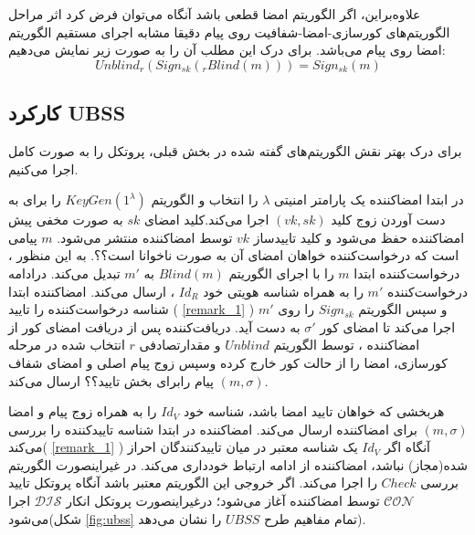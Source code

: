 \documentclass[12pt,a4paper]{article}
\begin{document}
علاوه‌براین، اگر الگوریتم امضا قطعی باشد آنگاه می‌توان فرض کرد اثر مراحل الگوریتم‌های کورسازی-امضا-شفافیت روی پیام دقیقا مشابه اجرای مستقیم الگوریتم امضا روی پیام می‌باشد. برای درک این مطلب آن را به صورت زیر نمایش می‌دهیم:
$$ Unblind_r(Sign_{sk}(_{r}Blind(m))) = Sign_{sk}(m) $$

\newpage
\subsection{کارکرد UBSS}\label{working_ubss}

برای درک بهتر نقش الگوریتم‌های گفته شده در بخش قبلی، پروتکل را به صورت کامل اجرا می‌کنیم.

در ابتدا امضاکننده یک پارامتر امنیتی 
$\lambda$
را انتخاب و الگوریتم 
$KeyGen(1^\lambda)$
را برای به دست آوردن زوج کلید
$(vk,sk)$
اجرا می‌کند.کلید امضای
$sk$
به صورت مخفی پیش امضاکننده حفظ می‌شود و کلید تاییدساز
$vk$
توسط امضاکننده منتشر می‌شود.
$m$
پیامی است که درخواست‌کننده خواهان امضای آن به صورت ناخوانا است؟؟. به این منظور ، درخواست‌کننده ابتدا 
$m$
 را با اجرای الگوریتم 
$Blind(m)$
به 
$m'$
تبدیل می‌کند.
درادامه درخواست‌کننده 
$m'$
را به همراه شناسه هویتی خود
$Id_R$
، ارسال می‌کند. امضاکننده ابتدا شناسه درخواست‌کننده را تایید (
\ref{remark_1}
) و سپس الگوریتم 
$Sign_{sk}$
را روی
$m'$
اجرا می‌کند تا امضای کور
$\sigma'$
به دست آید. دریافت‌کننده پس از دریافت امضای کور از امضاکننده ، توسط الگوریتم
$Unblind$
 و مقدارتصادفی 
$r$
انتخاب شده در مرحله کورسازی، امضا را از حالت کور خارج کرده وسپس زوج پیام اصلی و امضای شفاف
$(m,\sigma)$
پیام رابرای بخش تایید؟؟ ارسال می‌کند.

هربخشی که خواهان تایید امضا باشد، شناسه خود
$Id_V$
را به همراه زوج پیام و امضا 
$(m,\sigma)$
برای امضاکننده ارسال می‌کند. امضاکننده در ابتدا شناسه تاییدکننده را بررسی می‌کند(
\ref{remark_1}
) آنگاه اگر
$Id_V$
یک شناسه معتبر در میان تاییدکنندگان احراز شده(مجاز) نباشد، امضاکننده از ادامه ارتباط خودداری می‌کند. در غیراینصورت الگوریتم بررسی 
$Check$
را اجرا می‌کند. اگر خروجی این الگوریتم معتبر باشد آنگاه پروتکل تایید
$\mathcal{CON}$
توسط امضاکننده آغاز می‌شود؛ درغیراینصورت پروتکل انکار
$\mathcal{DIS}$
اجرا می‌شود(شکل 
\ref{fig:ubss}
 تمام مفاهیم طرح 
$UBSS$
را نشان می‌دهد).
\end{document}

